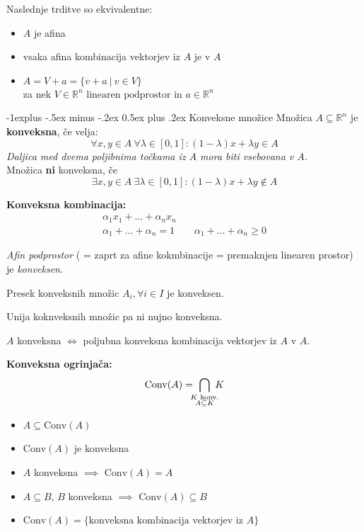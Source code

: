 \documentclass[a4paper,8pt]{extarticle}
\makeatletter
\renewcommand{\subsection}{\@startsection{subsection}{2}{0mm}%
                                {-1explus -.5ex minus -.2ex}%
                                {0.5ex plus .2ex}%
                                {\normalfont\normalsize\bfseries}}
\makeatother
\begin{document}
\begin{multicols}{4}
Naslednje trditve so ekvivalentne:
\begin{itemize}
	\item $A$ je afina
	\item vsaka afina kombinacija vektorjev iz $A$ je v $A$
	\item $A = V + a = \{ v + a\ |\ v \in V \}$\\ za nek $ V \in \mathbb{R}^n \text{ linearen podprostor}$ in $a \in \mathbb{R}^n$
\end{itemize}

\subsection{Konveksne množice}
Množica $A \subseteq \mathbb{R}^n $ je \textbf{konveksna}, če velja:
\[ \forall x,y \in A \ \forall \lambda \in [0,1] : (1-\lambda)x + \lambda y \in A \]
\emph{Daljica med dvema poljibnima točkama iz $A$ mora biti vsebovana v $A$.}\\

Množica \textbf{ni} konveksna, če
\[\exists x,y \in A \ \exists \lambda \in [0, 1]: (1-\lambda)x + \lambda y \notin A \]

\textbf{Konveksna kombinacija:}
\begin{gather*}
	\alpha_1 x_1 + \dots + \alpha_n x_n \\
	\alpha_1 + \dots + \alpha_n = 1 \qquad \alpha_1 + \dots + \alpha_n \geq 0 
\end{gather*}

\emph{Afin podprostor} ( = zaprt za afine kokmbinacije = premaknjen linearen prostor) je \emph{konveksen}.

Presek konveksnih množic $A_i, \forall i\in I$ je konveksen.

Unija koknveksnih množic pa ni nujno konveksna.

$A$ konveksna $\iff$ poljubna konveksna kombinacija vektorjev iz $A$ v $A$.

\textbf{Konveksna ogrinjača:} 
\begin{align*}
	\text{Conv}(A) =\ \bigcap_{\mathclap{\substack{K \text{ konv.}\\ A \subseteq K}}}\ K
\end{align*}
\begin{itemize}
	\item $A \subseteq \text{Conv}(A)$
	\item $\text{Conv}(A)$ je konveksna
	\item $A$ konveksna $\implies$ $\text{Conv}(A) = A$
	\item $A \subseteq B$, $B$ konveksna $\implies$ $\text{Conv}(A) \subseteq B$
	\item $\text{Conv}(A) = \{\text{konveksna kombinacija vektorjev iz $A$}\}$
\end{itemize}


\end{multicols}
\end{document}
